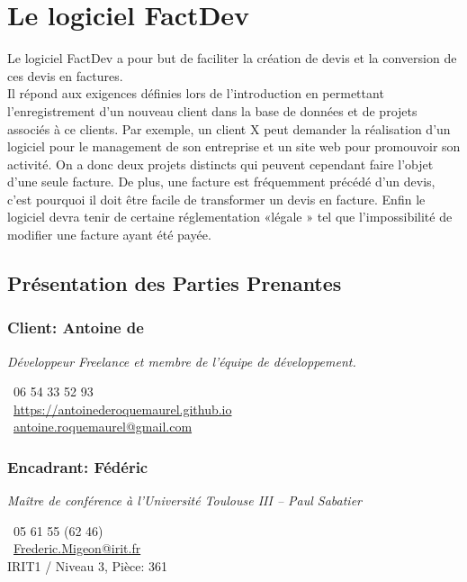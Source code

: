 \section{Le logiciel FactDev}\label{logiciel}
Le logiciel FactDev a pour but de faciliter la création de devis et la conversion de ces devis en factures. \\
Il répond aux exigences définies lors de l'introduction en permettant l'enregistrement d'un nouveau client dans la base de données et de projets associés à ce clients. Par exemple, un client X peut demander la réalisation d'un logiciel pour le management de son entreprise et un site web pour promouvoir son activité. On a donc deux projets distincts qui peuvent cependant faire l'objet d'une seule facture. De plus, une facture est fréquemment précédé d'un devis, c'est pourquoi il doit être facile de transformer un devis en facture. Enfin le logiciel devra tenir de certaine réglementation «légale » tel que l'impossibilité de modifier une facture ayant été payée. 

\subsection{Présentation des Parties Prenantes}
	\subsubsection{Client: Antoine de }
	\begin{flushleft} \textit{Développeur Freelance et membre de l'équipe de développement. }

		\Telefon~06 54 33 52 93\\
		\Mundus~\url{https://antoinederoquemaurel.github.io}\\
		\Letter~\href{mailto:antoine.roquemaurel@gmail.com}{antoine.roquemaurel@gmail.com} \\		
\end{flushleft}
	\subsubsection{Encadrant: Fédéric }
	\begin{flushleft} 
	\textit{Maître de conférence à l'Université Toulouse III -- Paul Sabatier}

		\Telefon~05 61 55 (62 46) \\
		\Letter~\href{mailto:Frederic.Migeon@irit.fr}{Frederic.Migeon@irit.fr} \\
		IRIT1 / Niveau 3, Pièce: 361 \\
\end{flushleft}
